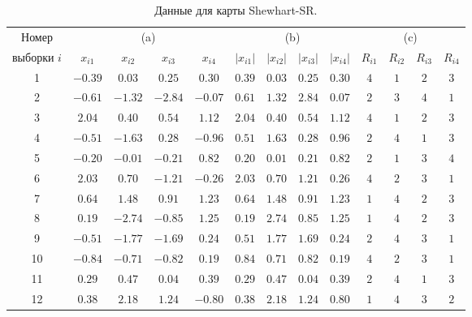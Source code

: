 \begin{table}[!ht]
	\centering
	\caption{Данные для карты Shewhart-SR.}
	\label{tab:4.7a}
	\small
	\begin{tabular}{@{}ccccccccccccc@{}}\toprule
		Номер & \multicolumn{4}{c}{(a)} & \multicolumn{4}{c}{(b)} & \multicolumn{4}{c}{(c)} \\
		выборки \(i\) & \(x_{i1}\) & \(x_{i2}\) & \(x_{i3}\) & \(x_{i4}\) & \(|x_{i1}|\) & \(|x_{i2}|\) & \(|x_{i3}|\) & \(|x_{i4}|\) & \(R_{i1}\) & \(R_{i2}\) & \(R_{i3}\) & \(R_{i4}\) \\ \midrule
		1 & \(-0.39\) & \(0.03\) & \(0.25\) & \(0.30\) & \(0.39\) & \(0.03\) & \(0.25\) & \(0.30\) & \(4\) & \(1\) & \(2\) & \(3\) \\
		2 & \(-0.61\) & \(-1.32\) & \(-2.84\) & \(-0.07\) & \(0.61\) & \(1.32\) & \(2.84\) & \(0.07\) & \(2\) & \(3\) & \(4\) & \(1\) \\
		3 & \(2.04\) & \(0.40\) & \(0.54\) & \(1.12\) & \(2.04\) & \(0.40\) & \(0.54\) & \(1.12\) & \(4\) & \(1\) & \(2\) & \(3\) \\
		4 & \(-0.51\) & \(-1.63\) & \(0.28\) & \(-0.96\) & \(0.51\) & \(1.63\) & \(0.28\) & \(0.96\) & \(2\) & \(4\) & \(1\) & \(3\) \\
		5 & \(-0.20\) & \(-0.01\) & \(-0.21\) & \(0.82\) & \(0.20\) & \(0.01\) & \(0.21\) & \(0.82\) & \(2\) & \(1\) & \(3\) & \(4\) \\
		6 & \(2.03\) & \(0.70\) & \(-1.21\) & \(-0.26\) & \(2.03\) & \(0.70\) & \(1.21\) & \(0.26\) & \(4\) & \(2\) & \(3\) & \(1\) \\
		7 & \(0.64\) & \(1.48\) & \(0.91\) & \(1.23\) & \(0.64\) & \(1.48\) & \(0.91\) & \(1.23\) & \(1\) & \(4\) & \(2\) & \(3\) \\
		8 & \(0.19\) & \(-2.74\) & \(-0.85\) & \(1.25\) & \(0.19\) & \(2.74\) & \(0.85\) & \(1.25\) & \(1\) & \(4\) & \(2\) & \(3\) \\
		9 & \(-0.51\) & \(-1.77\) & \(-1.69\) & \(0.24\) & \(0.51\) & \(1.77\) & \(1.69\) & \(0.24\) & \(2\) & \(4\) & \(3\) & \(1\) \\
		10 & \(-0.84\) & \(-0.71\) & \(-0.82\) & \(0.19\) & \(0.84\) & \(0.71\) & \(0.82\) & \(0.19\) & \(4\) & \(2\) & \(3\) & \(1\) \\
		11 & \(0.29\) & \(0.47\) & \(0.04\) & \(0.39\) & \(0.29\) & \(0.47\) & \(0.04\) & \(0.39\) & \(2\) & \(4\) & \(1\) & \(3\) \\
		12 & \(0.38\) & \(2.18\) & \(1.24\) & \(-0.80\) & \(0.38\) & \(2.18\) & \(1.24\) & \(0.80\) & \(1\) & \(4\) & \(3\) & \(2\) \\

\end{tabular}
\end{table}
